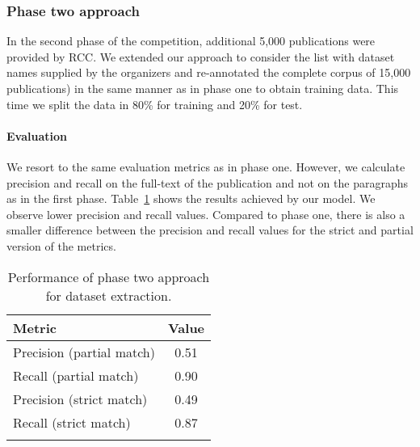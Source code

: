 \subsubsection{Phase two approach}
In the second phase of the competition, additional 5,000 publications were provided by RCC. We extended our approach to consider the list with dataset names supplied by the organizers and re-annotated the complete corpus of 15,000 publications) in the same manner as in phase one to obtain training data. This time we split the data in 80\% for training and 20\% for test. 

\paragraph{Evaluation}
We resort to the same evaluation metrics as in phase one. However, we calculate precision and recall on the full-text of the publication and not on the paragraphs as in the first phase. Table~\ref{table:dataset-mention-eval-phase-two} shows the results achieved by our model. We observe lower precision and recall values. Compared to phase one, there is also a smaller difference between the precision and recall values for the strict and partial version of the metrics. 
\begin{table}[hb]
    \center 
    \caption{Performance of phase two approach for dataset extraction.} 
    \begin{tabular}{lc} 
        \toprule
        Metric  & Value \\
        \midrule
        Precision (partial match)   & 0.51 \\
        Recall (partial match)      & 0.90 \\
        \midrule
        Precision (strict match)    & 0.49 \\
        Recall (strict match)       & 0.87 \\ 
        \bottomrule \\ 
    \end{tabular} 
    \label{table:dataset-mention-eval-phase-two} 
\end{table}


